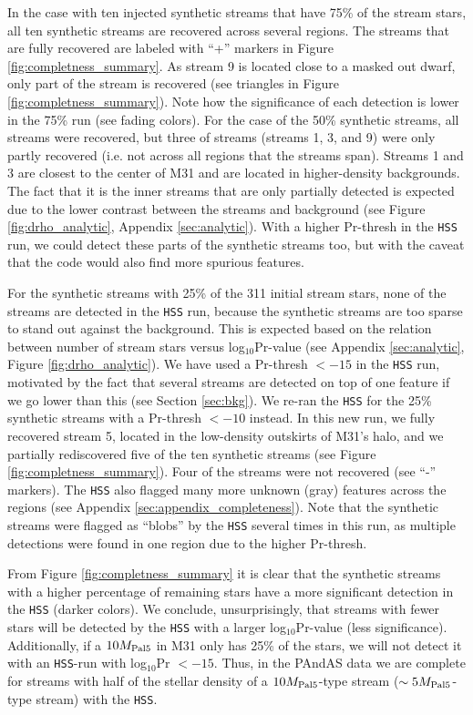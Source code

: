 \documentclass[twocolumn]{aastex631}
\begin{document}
In the case with ten injected synthetic streams that have 75\% of the stream stars, all ten synthetic streams are recovered across several regions. The streams that are fully recovered are labeled with ``+'' markers in Figure \ref{fig:completness_summary}.  As stream 9 is located close to a masked out dwarf, only part of the stream is recovered (see triangles in Figure \ref{fig:completness_summary}). Note how the significance of each detection is lower in the 75\% run (see fading colors). For the case of the 50\% synthetic streams, all streams were recovered, but three of streams (streams 1, 3, and 9) were only partly recovered (i.e. not across all regions that the streams span). Streams 1 and 3 are closest to the center of M31 and are located in higher-density backgrounds. The fact that it is the inner streams that are only partially detected is expected due to the lower contrast between the streams and background (see Figure \ref{fig:drho_analytic}, Appendix \ref{sec:analytic}). With a higher Pr-thresh in the \texttt{HSS} run, we could detect these parts of the synthetic streams too, but with the caveat that the code would also find more spurious features. 

For the synthetic streams with 25\% of the 311 initial stream stars, none of the streams are detected in the \texttt{HSS} run, because the synthetic streams are too sparse to stand out against the background. 
This is expected based on the relation between number of stream stars versus log$_{10}$Pr-value (see Appendix \ref{sec:analytic}, Figure \ref{fig:drho_analytic}). We have used a Pr-thresh $<-15$ in the \texttt{HSS}  run, motivated by the fact that several streams are detected on top of one feature if we go lower than this (see Section \ref{sec:bkg}). 
We re-ran the \texttt{HSS} for the 25\% synthetic streams with a Pr-thresh $<-10$ instead.  In this new run, we fully recovered stream 5, located in the low-density outskirts of M31's halo, and we partially rediscovered five of the ten synthetic streams (see Figure \ref{fig:completness_summary}). Four of the streams were not recovered (see ``-'' markers). The \texttt{HSS} also flagged many more unknown (gray) features across the regions (see Appendix \ref{sec:appendix_completeness}). Note that the synthetic streams were flagged as ``blobs'' by the  \texttt{HSS} several times in this run, as multiple detections were found in one region due to the higher Pr-thresh.


From Figure \ref{fig:completness_summary} it is clear that the synthetic streams with a higher percentage of remaining stars have a more significant detection in the \texttt{HSS} (darker colors). We conclude, unsurprisingly, that streams with fewer stars will be detected by the \texttt{HSS} with a larger log$_{10}$Pr-value (less significance). Additionally, if a $10{M}_{\rm Pal 5}$ in M31 only has 25\% of the stars, we will not detect it with an \texttt{HSS}-run with log$_{10}$Pr $<-15$. Thus, in the PAndAS data we are complete for streams with half of the stellar density of a $10 {M}_{\rm Pal 5}$-type stream ($\sim 5{M}_{\rm Pal 5}$-type stream) with the \texttt{HSS}.
\end{document}
